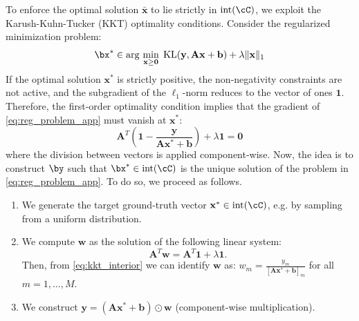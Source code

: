 \documentclass[11pt]{amsart}
\begin{document}
To enforce the optimal solution $\bar{\mathbf{x}}$ to lie strictly in $\operatorname{int}(\cC)$, we exploit the Karush-Kuhn-Tucker (KKT) optimality conditions.
Consider the regularized minimization problem:
\begin{equation}\label{eq:reg_problem_app}
\bx^* \in \mathrm{arg}\, \min_{\mathbf{x} \ge \mathbf{0}} \; \operatorname{KL}(\mathbf{y}, \mathbf{A}\mathbf{x} + \mathbf{b}) + \lambda \|\mathbf{x}\|_1
\end{equation}
If the optimal solution $\mathbf{x}^*$ is strictly positive, the non-negativity constraints are not active, and the subgradient of the $\ell_1$-norm reduces to the vector of ones $\mathbf{1}$. Therefore, the first-order optimality condition implies that the gradient of \eqref{eq:reg_problem_app} must vanish at $\mathbf{x}^*$:
\begin{equation}\label{eq:kkt_interior}
\mathbf{A}^T \left( \mathbf{1} - \frac{\mathbf{y}}{\mathbf{A}\mathbf{x}^* + \mathbf{b}} \right) + \lambda \mathbf{1} = \mathbf{0}
\end{equation}
where the division between vectors is applied component-wise. Now, the idea is to construct $\by$ such that $\bx^* \in \operatorname{int}(\cC)$ is the unique solution of the problem in \eqref{eq:reg_problem_app}. To do so, we proceed as follows.
\begin{enumerate}
    \item We generate the target ground-truth vector $\mathbf{x}^* \in \operatorname{int}(\cC)$, e.g. by sampling from a uniform distribution.
    \item We compute $\mathbf{w}$ as the solution of the following linear system:
$$
    \mathbf{A}^T \mathbf{w} = \mathbf{A}^T \mathbf{1} + \lambda \mathbf{1}.
$$ 
Then, from \eqref{eq:kkt_interior} we can identify $\mathbf{w}$ as: $w_m = \frac{y_m}{[\mathbf{A}\mathbf{x}^* + \mathbf{b}]_m}$ for all $m =1,\ldots,M$.
    \item We construct  $\mathbf{y}   = (\mathbf{A}\mathbf{x}^* + \mathbf{b}) \odot \mathbf{w}$ (component-wise multiplication).
\end{enumerate}
\end{document}

